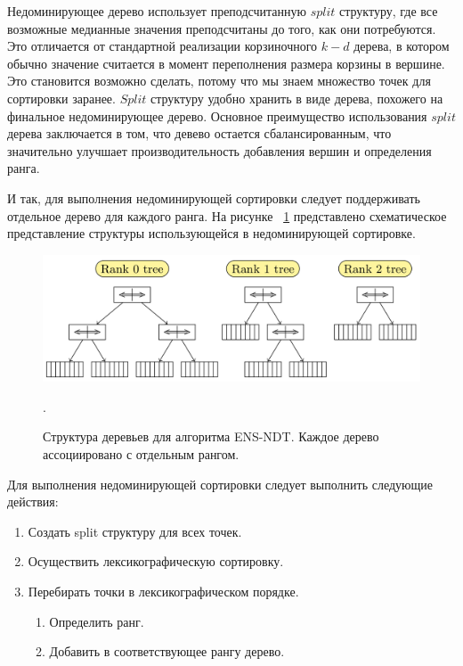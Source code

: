 Недоминирующее дерево использует преподсчитанную $split$ структуру, где все возможные медианные значения преподсчитаны до того, как они потребуются. Это отличается от стандартной реализации корзиночного $k-d$ дерева, в котором обычно значение считается в момент переполнения размера корзины в вершине. Это становится возможно сделать, потому что мы знаем множество точек для сортировки заранее. $Split$ структуру удобно хранить в виде дерева, похожего на финальное недоминирующее дерево. Основное преимущество использования $split$ дерева заключается в том, что девево остается сбалансированным, что значительно улучшает производительность добавления вершин и определения ранга. 

И так, для выполнения недоминирующей сортировки следует поддерживать отдельное дерево для каждого ранга. На рисунке ~\ref{ndtree_original} представлено схематическое представление структуры использующейся в недоминирующей сортировке.

\begin{figure}[!h]
\begin{center}
\includegraphics[width=15cm]{pic/ndtree_original.png}
\caption{Структура деревьев для алгоритма ENS-NDT. Каждое дерево ассоциировано с отдельным рангом.}.
\label{ndtree_original}
\end{center}
\end{figure}

Для выполнения недоминирующей сортировки следует выполнить следующие действия:
\begin{enumerate}
\item Создать split структуру для всех точек.
\item Осуществить лексикографическую сортировку.
\item Перебирать точки в лексикографическом порядке.
    \begin{enumerate}
    \item Определить ранг.
    \item Добавить в соответствующее рангу дерево.
    \end{enumerate}
\end{enumerate}

